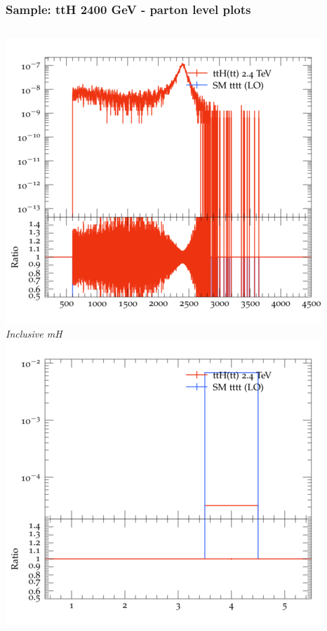 \documentclass{beamer}
\begin{document}
\begin{frame}
\frametitle{Sample: ttH 2400 GeV - parton level plots}
\begin{columns}
\includegraphics[width=\textwidth]{../plots/ttH_2400/tttt_ttH/Inclusive_mH.png}\\
\textit{\small Inclusive mH}
\includegraphics[width=\textwidth]{../plots/ttH_2400/tttt_ttH/Inclusive_nTop.png}\\

\end{columns}
\end{frame}
\end{document}
